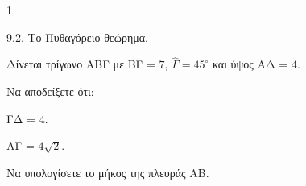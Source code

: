 \begin{ylh}{1}
    \item 9.2. Το Πυθαγόρειο θεώρημα.
\end{ylh}
\begin{figure}
    \centering
\end{figure}
Δίνεται τρίγωνο ΑΒΓ με ΒΓ = $7$, $\hat{\Gamma} = 45^\circ$ και ύψος ΑΔ = $4$.
\begin{alist}
    \item Να αποδείξετε ότι:
    \begin{rlist}
        \item ΓΔ = $4$. 
        \item ΑΓ = $4\sqrt{2}$. 
    \end{rlist}
    \item Να υπολογίσετε το μήκος της πλευράς ΑΒ. 
\end{alist}